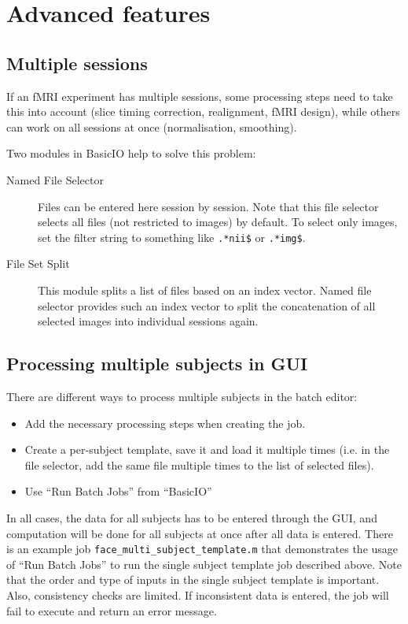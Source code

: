 \section{Advanced features}
\label{sec:batch_interface_advanced}

\subsection{Multiple sessions}

If an fMRI experiment has multiple sessions, some processing steps need to
take this into account (slice timing correction, realignment, fMRI design),
while others can work on all sessions at once (normalisation, smoothing). 

Two modules in BasicIO help to solve this problem:
\begin{description}
\item[Named File Selector] Files can be entered here session by session. Note
  that this file selector selects all files (not restricted to images) by
  default. To select only images, set the filter string to something like
  \verb|.*nii$| or \verb|.*img$|.
\item[File Set Split] This module splits a list of files based on an index
  vector. Named file selector provides such an index vector to split the
  concatenation of all selected images into individual sessions again.
\end{description}

\subsection{Processing multiple subjects in GUI}

There are different ways to process multiple subjects in the batch
editor:
\begin{itemize}
\item Add the necessary processing steps when creating the job.
\item Create a per-subject template, save it and load it multiple
  times (i.e. in the file selector, add the same file multiple times
  to the list of selected files).
\item Use ``Run Batch Jobs'' from ``BasicIO''
\end{itemize}
In all cases, the data for all subjects has to be entered through the
GUI, and computation will be done for all subjects at once after all
data is entered. There is an example job
\verb|face_multi_subject_template.m| that demonstrates the usage of
``Run Batch Jobs'' to run the single subject template job described
above. Note that the order and type of inputs in the single subject
template is important. Also, consistency checks are limited. If
inconsistent data is entered, the job will fail to execute and return
an error message.

